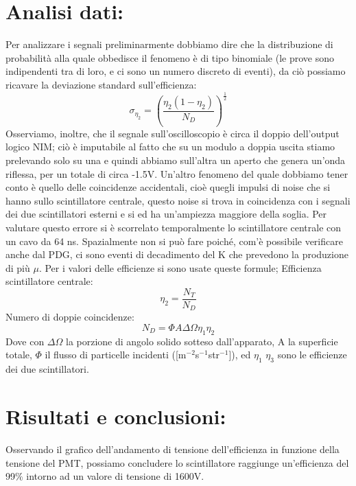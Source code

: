 \documentclass{article}
\begin{document}
\section{Analisi dati:}
Per analizzare i segnali preliminarmente dobbiamo dire che la distribuzione di probabilità alla quale obbedisce il fenomeno è di tipo binomiale (le prove sono indipendenti tra di loro, e ci sono un numero discreto di eventi), da ciò possiamo ricavare la deviazione standard sull'efficienza:
\begin{equation}
    \sigma_\eta_2=(\frac{\eta_2(1-\eta_2)}{N_D})^\frac{1}{2}
\end{equation}
Osserviamo, inoltre, che il segnale sull'oscilloscopio è circa il doppio dell'output logico NIM; ciò è imputabile al fatto che su un modulo a doppia uscita stiamo prelevando solo su una e quindi abbiamo sull'altra un aperto che genera un'onda riflessa, per un totale di circa -1.5V. Un'altro fenomeno del quale dobbiamo tener conto è quello delle coincidenze accidentali, cioè quegli impulsi di noise che si hanno sullo scintillatore centrale, questo noise si trova in coincidenza con i segnali dei due scintillatori esterni e si ed ha un'ampiezza maggiore della soglia. Per valutare questo errore si è scorrelato temporalmente lo scintillatore centrale con un cavo da 64 ns. Spazialmente non si può fare poiché, com'è possibile verificare anche dal PDG, ci sono eventi di decadimento del K che prevedono la produzione di più $\mu$.
Per i valori delle efficienze si sono usate queste formule;
Efficienza scintillatore centrale:
\begin{equation}
    \eta_2=\frac{N_T}{N_D}
\end{equation}
Numero di doppie coincidenze:
\begin{equation}
    N_D=\Phi A\Delta\Omega\eta_1\eta_2
\end{equation}
Dove con $\Delta\Omega$ la porzione di angolo solido sotteso dall'apparato, A la superficie totale, $\Phi$ il flusso di particelle incidenti ([m$^{-2}$s$^{-1}$str$^{-1}$]), ed $\eta_{1}$ $\eta_{3}$ sono le efficienze dei due scintillatori.
~
\section{Risultati e conclusioni:}
Osservando il grafico dell'andamento di tensione dell'efficienza in funzione della tensione del PMT, possiamo concludere lo scintillatore raggiunge un'efficienza del 99$\%$ intorno ad un valore di tensione di 1600V.
~
\end{document}
